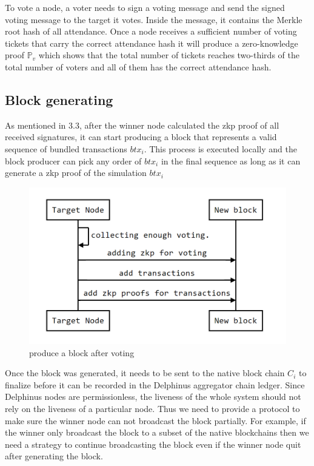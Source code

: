 \documentclass[pageno]{jpaper}
\begin{document}
To vote a node, a voter needs to sign a voting message and send the signed voting message to the target it votes. Inside the message, it contains the Merkle root hash of all attendance. Once a node receives a sufficient number of voting tickets that carry the correct attendance hash it will produce a zero-knowledge proof $\mathbb{P}_v$ which shows that the total number of tickets reaches two-thirds of the total number of voters and all of them has the correct attendance hash. 

\subsection{Block generating}
As mentioned in 3.3, after the winner node calculated the zkp proof of all received signatures, it can start producing a block that represents a valid sequence of bundled transactions $btx_i$. This process is executed locally and the block producer can pick any order of $btx_i$ in the final sequence as long as it can generate a zkp proof of the simulation $btx_i$

\begin{figure}[!ht]
\begin{center}
\includegraphics[scale=0.4]{produce-block.png}
\end{center}
\caption{produce a block after voting}
\label{produce-block}
\end{figure}

Once the block was generated, it needs to be sent to the native block chain $C_i$ to finalize before it can be recorded in the Delphinus aggregator chain ledger. Since Delphinus nodes are permissionless, the liveness of the whole system should not rely on the liveness of a particular node. Thus we need to provide a protocol to make sure the winner node can not broadcast the block partially. For example, if the winner only broadcast the block to a subset of the native blockchains then we need a strategy to continue broadcasting the block even if the winner node quit after generating the block.
\end{document}
